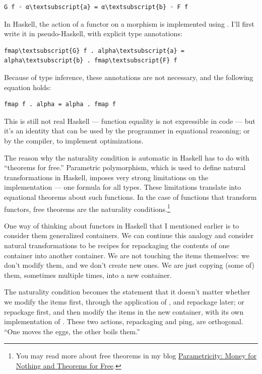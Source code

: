 \begin{Verbatim}[commandchars=\\\{\}]
G f ◦ α\textsubscript{a} = α\textsubscript{b} ◦ F f
\end{Verbatim}
In Haskell, the action of a functor  on a morphism 
is implemented using . I'll first write it in
pseudo-Haskell, with explicit type annotations:

\begin{Verbatim}[commandchars=\\\{\}]
fmap\textsubscript{G} f . alpha\textsubscript{a} = alpha\textsubscript{b} . fmap\textsubscript{F} f
\end{Verbatim}
Because of type inference, these annotations are not necessary, and the
following equation holds:

\begin{Verbatim}[commandchars=\\\{\}]
fmap f . alpha = alpha . fmap f
\end{Verbatim}
This is still not real Haskell --- function equality is not expressible
in code --- but it's an identity that can be used by the programmer in
equational reasoning; or by the compiler, to implement optimizations.

The reason why the naturality condition is automatic in Haskell has to
do with ``theorems for free.'' Parametric polymorphism, which is used to
define natural transformations in Haskell, imposes very strong
limitations on the implementation --- one formula for all types. These
limitations translate into equational theorems about such functions. In
the case of functions that transform functors, free theorems are the
naturality conditions.\footnote{
You may read more about free theorems in my
blog \href{https://bartoszmilewski.com/2014/09/22/parametricity-money-for-nothing-and-theorems-for-free/}{Parametricity:
Money for Nothing and Theorems for Free}.}

One way of thinking about functors in Haskell that I mentioned earlier
is to consider them generalized containers. We can continue this analogy
and consider natural transformations to be recipes for repackaging the
contents of one container into another container. We are not touching
the items themselves: we don't modify them, and we don't create new
ones. We are just copying (some of) them, sometimes multiple times, into
a new container.

The naturality condition becomes the statement that it doesn't matter
whether we modify the items first, through the application of
, and repackage later; or repackage first, and then modify
the items in the new container, with its own implementation of
. These two actions, repackaging and ping, are
orthogonal. ``One moves the eggs, the other boils them.''

